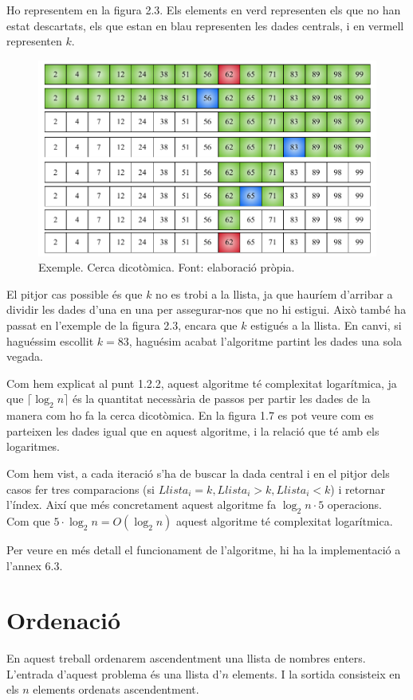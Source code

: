 Ho representem en la figura 2.3. Els elements en verd representen els que no han estat descartats, els que estan en blau representen les dades centrals, i en vermell representen $k$.
\vspace{18pt}
\begin{figure}[h]
    \centering
    \includegraphics[width=.75\textwidth]{capitols/figures/binary2.pdf}
    \caption[Exemple. Cerca dicotòmica.]{Exemple. Cerca dicotòmica. Font: elaboració pròpia.}
    \label{fig:my_label}
\end{figure}
El pitjor cas possible és que $k$ no es trobi a la llista, ja que hauríem d'arribar a dividir les dades d'una en una per assegurar-nos que no hi estigui. Això també ha passat en l'exemple de la figura 2.3, encara que $k$ estigués a la llista. En canvi, si haguéssim escollit $k = 83$, haguésim acabat l'algoritme partint les dades una sola vegada.

Com hem explicat al punt 1.2.2, aquest algoritme té complexitat logarítmica, ja que $\lceil\log_2{n}\rceil$ és la quantitat necessària de passos per partir les dades de la manera com ho fa la cerca dicotòmica. En la figura 1.7 es pot veure com es parteixen les dades igual que en aquest algoritme, i la relació que té amb els logaritmes.

Com hem vist, a cada iteració s'ha de buscar la dada central i en el pitjor dels casos fer tres comparacions (si $Llista_i = k, Llista_i > k, Llista_i < k$) i retornar l'índex. Així que més concretament aquest algoritme fa $\log_2{n} \cdot 5$ operacions. Com que $5 \cdot \log_2{n} = O(\log_2{n})$ aquest algoritme té complexitat logarítmica.

Per veure en més detall el funcionament de l'algoritme, hi ha la implementació a l'annex 6.3.

\section{Ordenació}
En aquest treball ordenarem ascendentment una llista de nombres enters. L'entrada d'aquest problema és una llista d'$n$ elements. I la sortida consisteix en els $n$ elements ordenats ascendentment.


